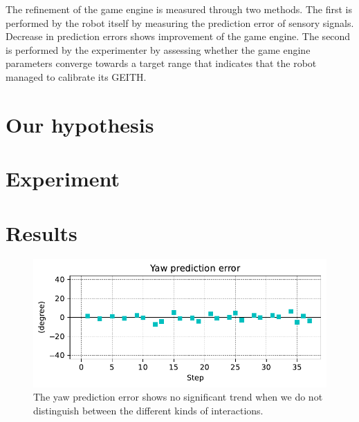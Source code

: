 \documentclass[runningheads]{llncs}
\begin{document}
The refinement of the game engine is measured through two methods. 
The first is performed by the robot itself by measuring the prediction error of sensory signals. 
Decrease in prediction errors shows improvement of the game engine. 
The second is performed by the experimenter by assessing whether the game engine parameters converge towards a target range that indicates that the robot managed to calibrate its GEITH. 




\section{Our hypothesis}




\section{Experiment}



\section{Results}

\begin{figure}
	\includegraphics[width=\textwidth]{02_yaw_pe.pdf}
	\caption{The yaw prediction error shows no significant trend when we do not distinguish between the different kinds of interactions.} \label{fig:yaw_pe}
\end{figure}
\end{document}
